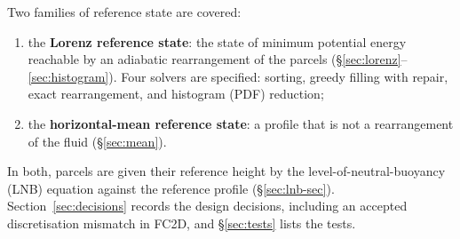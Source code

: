 \documentclass[11pt,a4paper]{article}
\begin{document}
\medskip
Two families of reference state are covered:
\begin{enumerate}
  \item the \textbf{Lorenz reference state}: the state of minimum potential energy reachable by an adiabatic
        rearrangement of the parcels (\S\ref{sec:lorenz}--\ref{sec:histogram}). Four solvers are specified: sorting,
        greedy filling with repair, exact rearrangement, and histogram (PDF) reduction;
  \item the \textbf{horizontal-mean reference state}: a profile that is not a rearrangement of the fluid
        (\S\ref{sec:mean}).
\end{enumerate}
In both, parcels are given their reference height by the level-of-neutral-buoyancy (LNB) equation against the reference
profile (\S\ref{sec:lnb-sec}). Section~\ref{sec:decisions} records the design decisions, including an accepted
discretisation mismatch in FC2D, and \S\ref{sec:tests} lists the tests.

\end{document}
